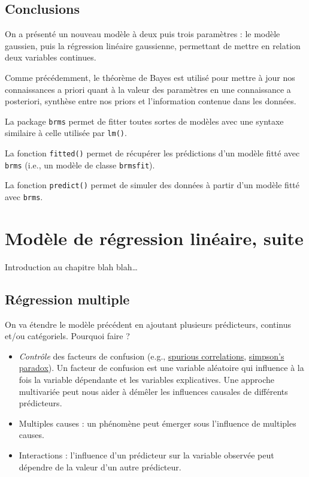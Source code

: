 \documentclass[
  a4paper,11pt,twoside,onecolumn,openright,final,oldfontcommands]{memoir}
\theoremstyle{definition}
\theoremstyle{definition}
\theoremstyle{definition}
\theoremstyle{remark}
\begin{document}
\hypertarget{conclusions-1}{%
\section{Conclusions}\label{conclusions-1}}

On a présenté un nouveau modèle à deux puis trois paramètres : le modèle gaussien, puis la régression linéaire gaussienne, permettant de mettre en relation deux variables continues.

Comme précédemment, le théorème de Bayes est utilisé pour mettre à jour nos connaissances a priori quant à la valeur des paramètres en une connaissance a posteriori, synthèse entre nos priors et l'information contenue dans les données.

La package \texttt{brms} permet de fitter toutes sortes de modèles avec une syntaxe similaire à celle utilisée par \texttt{lm()}.

La fonction \texttt{fitted()} permet de récupérer les prédictions d'un modèle fitté avec \texttt{brms} (i.e., un modèle de classe \texttt{brmsfit}).

La fonction \texttt{predict()} permet de simuler des données à partir d'un modèle fitté avec \texttt{brms}.

\hypertarget{linear-regression2}{%
\chapter{Modèle de régression linéaire, suite}\label{linear-regression2}}


Introduction au chapitre blah blah\ldots{}

\hypertarget{ruxe9gression-multiple}{%
\section{Régression multiple}\label{ruxe9gression-multiple}}

On va étendre le modèle précédent en ajoutant plusieurs prédicteurs, continus et/ou catégoriels. Pourquoi faire ?

\begin{itemize}
\item
  \emph{Contrôle} des facteurs de confusion (e.g., \href{http://www.tylervigen.com/spurious-correlations}{spurious correlations}, \href{https://en.wikipedia.org/wiki/Simpson\%27s_paradox}{simpson's paradox}). Un facteur de confusion est une variable aléatoire qui influence à la fois la variable dépendante et les variables explicatives. Une approche multivariée peut nous aider à démêler les influences causales de différents prédicteurs.
\item
  Multiples causes : un phénomène peut émerger sous l'influence de multiples causes.
\item
  Interactions : l'influence d'un prédicteur sur la variable observée peut dépendre de la valeur d'un autre prédicteur.
\end{itemize}
\end{document}
